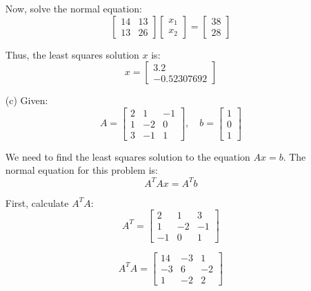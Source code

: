 \documentclass[12pt]{article}
\begin{document}
\begin{enumerate}
    Now, solve the normal equation:
    \[
      \begin{bmatrix} 14 & 13 \\ 13 & 26 \end{bmatrix} \begin{bmatrix} x_1 \\ x_2 \end{bmatrix} = \begin{bmatrix} 38 \\ 28 \end{bmatrix}
    \]

    Thus, the least squares solution \( x \) is:
    \[
      x = \begin{bmatrix} 3.2 \\ -0.52307692 \end{bmatrix}
    \]

    \pagebreak

  \item[(c)]
    Given:
    \[
      A = \begin{bmatrix} 2 & 1 & -1 \\ 1 & -2 & 0 \\ 3 & -1 & 1 \end{bmatrix}, \quad b = \begin{bmatrix} 1 \\ 0 \\ 1 \end{bmatrix}
    \]

    We need to find the least squares solution to the equation \( Ax = b \). The normal equation for this problem is:
    \[
      A^T A x = A^T b
    \]

    First, calculate \( A^T A \):
    \[
      A^T = \begin{bmatrix} 2 & 1 & 3 \\ 1 & -2 & -1 \\ -1 & 0 & 1 \end{bmatrix}
    \]

    \[
      A^T A = \begin{bmatrix} 14 & -3 & 1 \\ -3 & 6 & -2 \\ 1 & -2 & 2 \end{bmatrix}
    \]


\end{enumerate}
\end{document}
